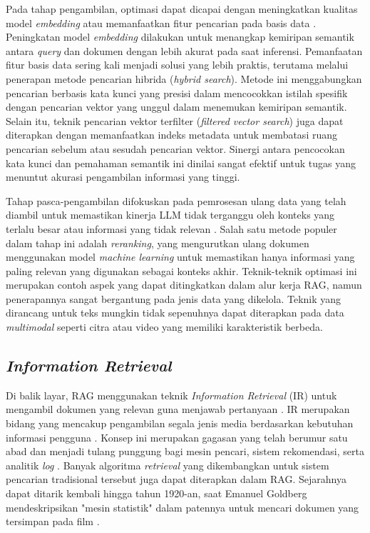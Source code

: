 Pada tahap pengambilan, optimasi dapat dicapai dengan meningkatkan kualitas model \textit{embedding} atau memanfaatkan fitur pencarian pada basis data \parencite{iusztinLLMEngineersHandbook2024}. Peningkatan model \textit{embedding} dilakukan untuk menangkap kemiripan semantik antara \textit{query} dan dokumen dengan lebih akurat pada saat inferensi. Pemanfaatan fitur basis data sering kali menjadi solusi yang lebih praktis, terutama melalui penerapan metode pencarian hibrida (\textit{hybrid search}). Metode ini menggabungkan pencarian berbasis kata kunci yang presisi dalam mencocokkan istilah spesifik dengan pencarian vektor yang unggul dalam menemukan kemiripan semantik. Selain itu, teknik pencarian vektor terfilter (\textit{filtered vector search}) juga dapat diterapkan dengan memanfaatkan indeks metadata untuk membatasi ruang pencarian sebelum atau sesudah pencarian vektor. Sinergi antara pencocokan kata kunci dan pemahaman semantik ini dinilai sangat efektif untuk tugas yang menuntut akurasi pengambilan informasi yang tinggi.

Tahap pasca-pengambilan difokuskan pada pemrosesan ulang data yang telah diambil untuk memastikan kinerja LLM tidak terganggu oleh konteks yang terlalu besar atau informasi yang tidak relevan \parencite{iusztinLLMEngineersHandbook2024}. Salah satu metode populer dalam tahap ini adalah \textit{reranking}, yang mengurutkan ulang dokumen menggunakan model \textit{machine learning} untuk memastikan hanya informasi yang paling relevan yang digunakan sebagai konteks akhir. Teknik-teknik optimasi ini merupakan contoh aspek yang dapat ditingkatkan dalam alur kerja RAG, namun penerapannya sangat bergantung pada jenis data yang dikelola. Teknik yang dirancang untuk teks mungkin tidak sepenuhnya dapat diterapkan pada data \textit{multimodal} seperti citra atau video yang memiliki karakteristik berbeda.

\subsection{\textit{Information Retrieval}}
Di balik layar, RAG menggunakan teknik \textit{Information Retrieval} (IR) untuk mengambil dokumen yang relevan guna menjawab pertanyaan \parencite{huyenAIEngineeringBuilding2025}. IR merupakan bidang yang mencakup pengambilan segala jenis media berdasarkan kebutuhan informasi pengguna \parencite{jm3}. Konsep ini merupakan gagasan yang telah berumur satu abad dan menjadi tulang punggung bagi mesin pencari, sistem rekomendasi, serta analitik \textit{log} \parencite{huyenAIEngineeringBuilding2025}. Banyak algoritma \textit{retrieval} yang dikembangkan untuk sistem pencarian tradisional tersebut juga dapat diterapkan dalam RAG. Sejarahnya dapat ditarik kembali hingga tahun 1920-an, saat Emanuel Goldberg mendeskripsikan "mesin statistik" dalam patennya untuk mencari dokumen yang tersimpan pada film \parencite{al-aminHistoryGenerativeArtificial2024}. 

